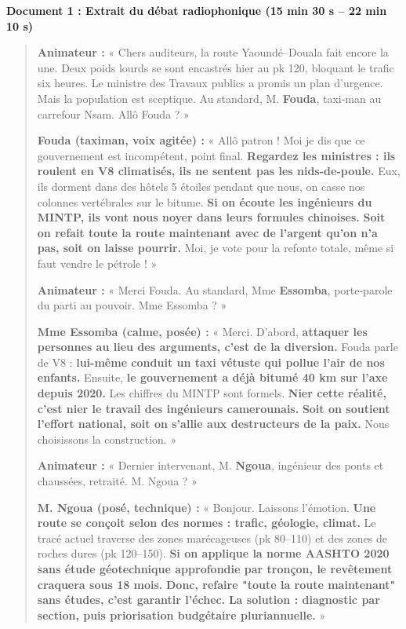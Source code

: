\documentclass[11pt]{article}
\begin{document}
\bigskip
\noindent\textbf{Document 1 : Extrait du débat radiophonique (15 min 30 s -- 22 min 10 s)}
\begin{quote}
\textbf{Animateur :} « Chers auditeurs, la route Yaoundé–Douala fait encore la une. Deux poids lourds se sont encastrés hier au pk 120, bloquant le trafic six heures. Le ministre des Travaux publics a promis un plan d'urgence. Mais la population est sceptique. Au standard, M. \textbf{Fouda}, taxi-man au carrefour Nsam. Allô Fouda ? »

\textbf{Fouda (taximan, voix agitée) :} « Allô patron ! Moi je dis que ce gouvernement est incompétent, point final. \textbf{Regardez les ministres : ils roulent en V8 climatisés, ils ne sentent pas les nids-de-poule.} Eux, ils dorment dans des hôtels 5 étoiles pendant que nous, on casse nos colonnes vertébrales sur le bitume. \textbf{Si on écoute les ingénieurs du MINTP, ils vont nous noyer dans leurs formules chinoises.} \textbf{Soit on refait toute la route maintenant avec de l'argent qu'on n'a pas, soit on laisse pourrir.} Moi, je vote pour la refonte totale, même si faut vendre le pétrole ! »

\textbf{Animateur :} « Merci Fouda. Au standard, Mme \textbf{Essomba}, porte-parole du parti au pouvoir. Mme Essomba ? »

\textbf{Mme Essomba (calme, posée) :} « Merci. D'abord, \textbf{attaquer les personnes au lieu des arguments, c'est de la diversion.} Fouda parle de V8 : \textbf{lui-même conduit un taxi vétuste qui pollue l'air de nos enfants.} Ensuite, \textbf{le gouvernement a déjà bitumé 40 km sur l'axe depuis 2020.} Les chiffres du MINTP sont formels. \textbf{Nier cette réalité, c'est nier le travail des ingénieurs camerounais.} \textbf{Soit on soutient l'effort national, soit on s'allie aux destructeurs de la paix.} Nous choisissons la construction. »

\textbf{Animateur :} « Dernier intervenant, M. \textbf{Ngoua}, ingénieur des ponts et chaussées, retraité. M. Ngoua ? »

\textbf{M. Ngoua (posé, technique) :} « Bonjour. Laissons l'émotion. \textbf{Une route se conçoit selon des normes : trafic, géologie, climat.} Le tracé actuel traverse des zones marécageuses (pk 80--110) et des zones de roches dures (pk 120--150). \textbf{Si on applique la norme AASHTO 2020 sans étude géotechnique approfondie par tronçon, le revêtement craquera sous 18 mois.} \textbf{Donc, refaire "toute la route maintenant" sans études, c'est garantir l'échec.} \textbf{La solution : diagnostic par section, puis priorisation budgétaire pluriannuelle.} »
\end{quote}
\end{document}
